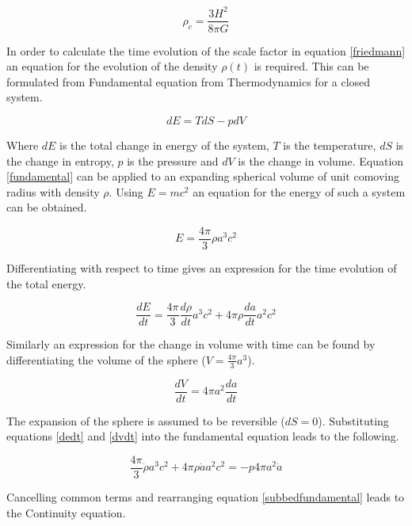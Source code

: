 \documentclass[12pt]{article} %
\begin{document}
\begin{equation}
\rho_{c} = \frac{3H^2}{8\pi G}
\end{equation}

In order to calculate the time evolution of the scale factor in equation \ref{friedmann} an equation for the evolution of the density $\rho(t)$ is required. This can be formulated from Fundamental equation from Thermodynamics for a closed system\cite{cambridge}.

\begin{equation}\label{fundamental}
dE = TdS - pdV
\end{equation}

Where $dE$ is the total change in energy of the system, $T$ is the temperature, $dS$ is the change in entropy, $p$ is the pressure and $dV$ is the change in volume. Equation \ref{fundamental} can be applied to an expanding spherical volume of unit comoving radius with density $\rho$. Using $E=mc^2$ an equation for the energy of such a system can be obtained.

\begin{equation}\label{energysphere}
E = \frac{4\pi}{3}\rho a^3 c^2
\end{equation}

Differentiating with respect to time gives an expression for the time evolution of the total energy.

\begin{equation}\label{dedt}
\frac{dE}{dt} = \frac{4\pi}{3} \frac{d\rho}{dt}a^3 c^2 + 4\pi\rho \frac{da}{dt}a^2 c^2
\end{equation}

Similarly an expression for the change in volume with time can be found by differentiating the volume of the sphere ($V = \frac{4\pi}{3}a^3$).

\begin{equation}\label{dvdt}
\frac{dV}{dt} = 4\pi a^2 \frac{da}{dt}
\end{equation}

The expansion of the sphere is assumed to be reversible ($dS = 0$). Substituting equations \ref{dedt} and \ref{dvdt} into the fundamental equation leads to the following.

\begin{equation}\label{subbedfundamental}
\frac{4\pi}{3} \dot \rho a^3 c^2 + 4\pi\rho \dot a a^2 c^2 = - p 4\pi a^2 \dot a
\end{equation}

Cancelling common terms and rearranging equation \ref{subbedfundamental} leads to the Continuity equation.
\end{document}
